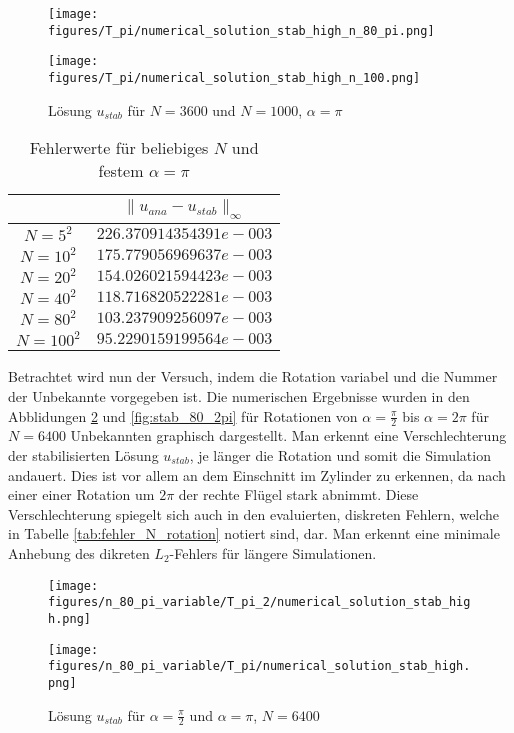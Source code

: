 \documentclass[12pt,titlepage]{article}
\begin{document}
\begin{figure}[H]
\hspace{0.1cm}
\begin{minipage}{0.4\textwidth}
\texttt{[image: figures/T\_pi/numerical\_solution\_stab\_high\_n\_80\_pi.png]}
\end{minipage}
\hspace{1.4cm}
\begin{minipage}{0.4\textwidth}
\texttt{[image: figures/T\_pi/numerical\_solution\_stab\_high\_n\_100.png]}
\end{minipage}
\caption{Lösung $u_{stab}$ für $N=3600$ und $N=1000$, $\alpha=\pi$}
\label{fig:stab_80_100_pi}
\end{figure}
\noindent
\begin{table}[H]
\centering
\begin{tabular}[\textwidth]{|c|c|}
\hline
  & $\|u_{ana}-u_{stab}\|_{\infty}$\\
\hline
$N=5^2$ & $226.370914354391e-003$\\
$N=10^2$ & $175.779056969637e-003$\\
$N=20^2$ & $154.026021594423e-003$\\
\hline
$N=40^2$ & $118.716820522281e-003$\\
$N=80^2$ & $103.237909256097e-003$\\
$N=100^2$ & $95.2290159199564e-003$\\
\hline
\end{tabular}
\caption{Fehlerwerte für beliebiges $N$ und festem $\alpha=\pi$}
\label{tab:fehler_N_pi}
\end{table}
\noindent
Betrachtet wird nun der Versuch, indem die Rotation variabel und die Nummer der Unbekannte vorgegeben ist. Die numerischen Ergebnisse wurden in den Abblidungen \ref{fig:stab_80_pi} und \ref{fig:stab_80_2pi} für Rotationen von $\alpha=\frac{\pi}{2}$ bis $\alpha=2\pi$ für $N=6400$ Unbekannten graphisch dargestellt. Man erkennt eine Verschlechterung der stabilisierten Lösung $u_{stab}$, je länger die Rotation und somit die Simulation andauert. Dies ist vor allem an dem Einschnitt im Zylinder zu erkennen, da nach einer einer Rotation um  $2\pi$ der rechte Flügel stark abnimmt. Diese Verschlechterung spiegelt sich auch in den evaluierten, diskreten Fehlern, welche in Tabelle \ref{tab:fehler_N_rotation} notiert sind, dar. Man erkennt eine minimale Anhebung des dikreten $L_2$-Fehlers für längere Simulationen.
\begin{figure}[H]
\hspace{0.1cm}
\begin{minipage}{0.4\textwidth}
\texttt{[image: figures/n\_80\_pi\_variable/T\_pi\_2/numerical\_solution\_stab\_high.png]}
\end{minipage}
\hspace{1.4cm}
\begin{minipage}{0.4\textwidth}
\texttt{[image: figures/n\_80\_pi\_variable/T\_pi/numerical\_solution\_stab\_high.png]}
\end{minipage}
\caption{Lösung $u_{stab}$ für $\alpha=\frac{\pi}{2}$ und $\alpha=\pi$, $N=6400$}
\label{fig:stab_80_pi}
\end{figure}
\end{document}

